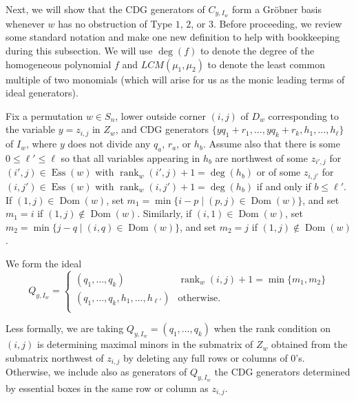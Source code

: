 \documentclass[ALCO,Unicode,published]{cedram}
\DeclareMathOperator{\Ess}{Ess}
\DeclareMathOperator{\rank}{rank}
\DeclareMathOperator{\Dom}{Dom}
\begin{document}
Next, we will show that the CDG generators of $C_{y,I_w}$ form a Gr\"obner basis whenever $w$ has no obstruction of Type $1$, $2$, or $3$.  Before proceeding, we review some standard notation and make one new definition to help with bookkeeping during this subsection.  We will use $\deg(f)$ to denote the degree of the homogeneous polynomial $f$ and $LCM(\mu_1,\mu_2)$ to denote the least common multiple of two monomials (which will arise for us as the monic leading terms of ideal generators).  

\begin{definition}\label{def:Qdef}
Fix a permutation $w \in S_n$, lower outside corner $(i,j)$ of $D_w$ corresponding to the variable $y = z_{i,j}$ in $Z_w$, and CDG generators $\{yq_1+r_1, \ldots, yq_k+r_k, h_1, \ldots, h_\ell \}$ of $I_w$, where $y$ does not divide any $q_a$, $r_a$, or $h_b$.  Assume also that there is some $0 \leq \ell' \leq \ell$ so that all variables appearing in $h_b$ are northwest of some $z_{i',j}$ for $(i',j) \in \Ess(w)$ with $\rank_w(i',j) +1= \deg(h_b)$ or of some $z_{i,j'}$ for $(i,j') \in \Ess(w)$ with $\rank_w(i,j') +1= \deg(h_b)$ if and only if $b \leq \ell'$.  If $(1,j) \in \Dom(w)$, set $m_1 = \min\{i-p \mid (p,j) \in \Dom(w)\}$, and set $m_1 = i$ if $(1,j) \notin \Dom(w)$.  Similarly, if $(i,1) \in \Dom(w)$, set $m_2 = \min\{j-q \mid (i,q) \in \Dom(w)\}$, and set $m_2 = j$ if $(1,j) \notin \Dom(w)$. 

We form the ideal \[ Q_{y,I_w} = \begin{cases} 
      (q_1, \ldots, q_k) & \rank_w(i,j)+1 = \min\{m_1,m_2\} \\
     (q_1, \ldots, q_k, h_1, \ldots, h_{\ell'}) & \mbox{otherwise}. \\
   \end{cases}
\]
\end{definition}

Less formally, we are taking $Q_{y,I_w} = (q_1, \ldots, q_k)$ when the rank condition on $(i,j)$ is determining maximal minors in the submatrix of $Z_w$ obtained from the submatrix northwest of $z_{i,j}$ by deleting any full rows or columns of $0$'s.  Otherwise, we include also as generators of $Q_{y,I_w}$ the CDG generators determined by essential boxes in the same row or column as $z_{i,j}$.  
\end{document}
